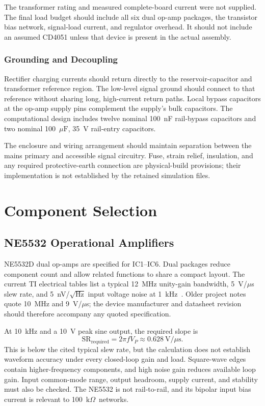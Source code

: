 \documentclass[11pt,a4paper]{article}
\newcommand{\kohm}{\ensuremath{\mathrm{k}\Omega}}
\newcommand{\uF}{\ensuremath{\mu\mathrm{F}}}
\begin{document}
The transformer rating and measured complete-board current were not supplied. The final load budget should include all six dual op-amp packages, the transistor bias network, signal-load current, and regulator overhead. It should not include an assumed CD4051 unless that device is present in the actual assembly.

\subsubsection{Grounding and Decoupling}
Rectifier charging currents should return directly to the reservoir-capacitor and transformer reference region. The low-level signal ground should connect to that reference without sharing long, high-current return paths. Local bypass capacitors at the op-amp supply pins complement the supply's bulk capacitors. The computational design includes twelve nominal 100~nF rail-bypass capacitors and two nominal 100~\uF, 35~V rail-entry capacitors.

The enclosure and wiring arrangement should maintain separation between the mains primary and accessible signal circuitry. Fuse, strain relief, insulation, and any required protective-earth connection are physical-build provisions; their implementation is not established by the retained simulation files.

\section{Component Selection}
\subsection{NE5532 Operational Amplifiers}
NE5532D dual op-amps are specified for IC1--IC6. Dual packages reduce component count and allow related functions to share a compact layout. The current TI electrical tables list a typical 12~MHz unity-gain bandwidth, 5~V/$\mu$s slew rate, and 5~nV/$\sqrt{\mathrm{Hz}}$ input voltage noise at 1~kHz~\cite{ne5532}. Older project notes quote 10~MHz and 9~V/$\mu$s; the device manufacturer and datasheet revision should therefore accompany any quoted specification.

At 10~kHz and a 10~V peak sine output, the required slope is
\begin{equation}
\mathrm{SR}_{\mathrm{required}}=2\pi fV_P
\approx0.628~\mathrm{V}/\mu\mathrm{s}.
\end{equation}
This is below the cited typical slew rate, but the calculation does not establish waveform accuracy under every closed-loop gain and load. Square-wave edges contain higher-frequency components, and high noise gain reduces available loop gain. Input common-mode range, output headroom, supply current, and stability must also be checked. The NE5532 is not rail-to-rail, and its bipolar input bias current is relevant to 100~\kohm\ networks.
\end{document}

